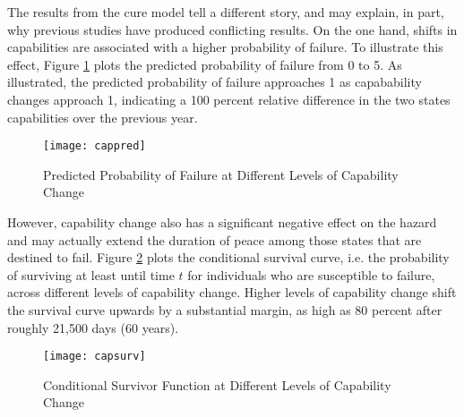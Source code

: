The results from the cure model tell a different story, and may explain, in part, why previous studies have produced conflicting results. On the one hand, shifts in capabilities are associated with a higher probability of failure. To illustrate this effect, Figure \ref{fig:lhr.cap.pp} plots the predicted probability of failure from 0 to 5.%
As illustrated, the predicted probability of failure approaches 1 as capabability changes approach 1, indicating a 100 percent relative difference in the two states capabilities over the previous year.

\begin{figure}[htbp]\centering
	\caption{Predicted Probability of Failure at Different Levels of Capability Change}
	\texttt{[image: cappred]}
	\label{fig:lhr.cap.pp}
\end{figure}

However, capability change also has a significant negative effect on the hazard and may actually extend the duration of peace among those states that are destined to fail. Figure \ref{fig:lhr.cap.surv} plots the conditional survival curve, i.e. the probability of surviving at least until time $t$ for individuals who are susceptible to failure, across different levels of capability change. Higher levels of capability change shift the survival curve upwards by a substantial margin, as high as 80 percent after roughly 21,500 days (60 years). 

\begin{figure}[htbp]\centering
	\caption{Conditional Survivor Function at Different Levels of Capability Change}
	\texttt{[image: capsurv]}
	\label{fig:lhr.cap.surv}
\end{figure}

